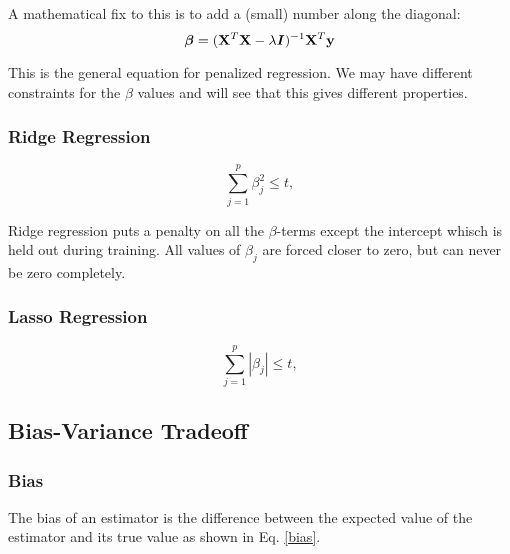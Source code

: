 A mathematical fix to this is to add a (small) number along the diagonal: 
\begin{equation}
    \boldsymbol{\beta} = (\mathbf{X}^T\mathbf{X}- \lambda\boldsymbol{I})^{-1}\mathbf{X}^T\mathbf{y}
\end{equation}

This is the general equation for penalized regression. We may have different constraints for the $\beta$ values and will see that this gives different properties. 


\subsubsection{Ridge Regression}

\begin{equation}
    \sum_{j=1}^p \beta_j^2 \leq t, 
\end{equation}

Ridge regression puts a penalty on all the $\beta$-terms except the intercept whisch is held out during training. All values of $\beta_j$ are forced closer to zero, but can never be zero completely. 



\subsubsection{Lasso Regression}

\begin{equation}
    \sum_{j=1}^p | \beta_j | \leq t, 
\end{equation}







\subsection{Bias-Variance Tradeoff}


\subsubsection{Bias}
The bias of an estimator is the difference between the expected value of the estimator and its true value as shown in Eq. \ref{bias}. 

